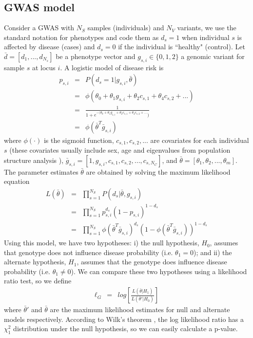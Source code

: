 \subsection{GWAS model}

Consider a GWAS with $N_S$  samples (individuals) and $N_V$ variants, we use the standard notation for phenotypes and code them as $d_s=1$ when individual $s$ is affected by disease (cases) and $d_s=0$ if the individual is ``healthy" (control). 
Let $\bar{d} = [d_1, ..., d_{N_s}]$ be a phenotype vector and $g_{s,i} \in \{0,1,2\}$ a genomic variant for sample $s$ at locus $i$. A logistic model of disease risk \cite{balding2006tutorial} is
\begin{eqnarray*}
    p_{s,i} & = & P( d_s=1 | g_{s,i}, \bar{\theta} ) \\
    & = & \phi( \theta_0 + \theta_1 g_{s,i} + \theta_2 c_{s,1} + \theta_4 c_{s,2} + ... ) \\
    & = & \frac{1}{1 + e^{-(\theta_0 + \theta_1 g_{s,i} + \theta_2 c_{s,1} + \theta_4 c_{s,2} + ...})} \\
    & = & \phi( \bar{\theta}^T \bar{g}_{s,i})
\end{eqnarray*}
\noindent where $\phi(\cdot)$ is the sigmoid function, $c_{s,1}, c_{s,2}, ... $ are covariates for each individual $s$ (these covariates usually include sex, age and eigenvalues from population structure analysis \cite{price2006principal}), $\bar{g}_{s,i} = [ 1, g_{s,i} , c_{s,1}, c_{s,2}, ... , c_{s,N_C} ]$, and $\bar{\theta} = [\theta_1, \theta_2, ..., \theta_m] $. 
The parameter estimates $\bar{\theta}$ are obtained by solving the maximum likelihood equation
\begin{eqnarray*}
    L( \bar{\theta} ) & = & \prod_{s=1}^{N_S}{ P( d_s | \bar{\theta}, g_{s,i} ) } \\
    & = & \prod_{s=1}^{N_S}{ p_{s,i}^{d_s} (1-p_{s,i})^{1-d_s} } \\
    & = & \prod_{s=1}^{N_S}{ \phi( \bar{\theta}^T \bar{g}_{s,i})^{d_s} (1-\phi( \bar{\theta}^T \bar{g}_{s,i}))^{1-d_s} }
\end{eqnarray*}
Using this model, we have two hypotheses: 
i) the null hypothesis, $H_0$, assumes that genotype does not influence disease probability (i.e. $\theta_1 = 0$); and
ii) the alternate hypothesis, $H_1$, assumes that the genotype does influence disease probability (i.e. $\theta_1 \neq 0$). 
We can compare these two hypotheses using a likelihood ratio test, so we define
\begin{eqnarray*} \label{eq:gwasLogLikLogReg}
	\ell_G & = & log \left[ \frac{L( \bar{\theta} | H_1 ) }{ L( \bar{\theta}' | H_0 ) } \right]
\end{eqnarray*}
\noindent where $\bar{\theta}'$ and $\bar{\theta}$ are the maximum likelihood estimates for null and alternate models respectively. 
According to Wilk's theorem \cite{wilks1938large}, the log likelihood ratio has a $\chi^2_1$ distribution under the null hypothesis, so we can easily calculate a p-value.

